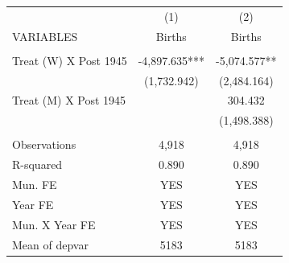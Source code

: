 \begin{tabular}{lcc} \hline
 & (1) & (2) \\
VARIABLES & Births & Births \\ \hline
 &  &  \\
Treat (W) X Post 1945 & -4,897.635*** & -5,074.577** \\
 & (1,732.942) & (2,484.164) \\
Treat (M) X Post 1945 &  & 304.432 \\
 &  & (1,498.388) \\
 &  &  \\
Observations & 4,918 & 4,918 \\
R-squared & 0.890 & 0.890 \\
Mun. FE & YES & YES \\
Year FE & YES & YES \\
Mun. X Year FE & YES & YES \\
 Mean of depvar & 5183 & 5183 \\ \hline
\end{tabular}

